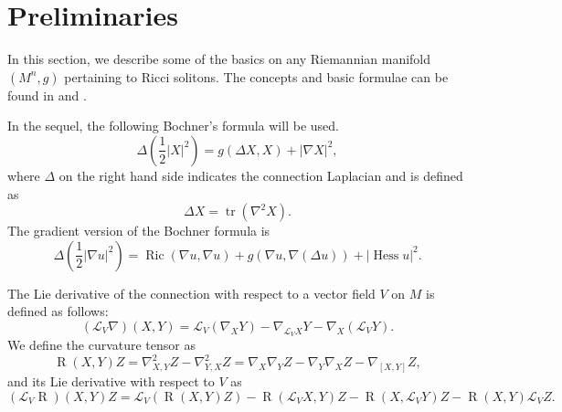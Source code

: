 \documentclass{amsart}
\newcommand{\abs}[1]{\left| #1 \right|}
\newcommand{\lie}[1]{\mathcal{L}_{#1}}
\newcommand{\brackets}[1]{\left( #1 \right)}
\DeclareMathOperator*{\ricci}{Ric}
\DeclareMathOperator*{\trace}{tr}
\DeclareMathOperator*{\curvature}{R}
\DeclareMathOperator*{\hessian}{Hess}
\theoremstyle{plain}
\theoremstyle{plain}
\theoremstyle{plain}
\theoremstyle{plain}
\theoremstyle{remark}
\begin{document}
\section{Preliminaries}\label{prelim}
In  this section,  we describe some of the basics  on any Riemannian manifold $(M^n,g)$  pertaining to Ricci solitons. The concepts and basic formulae  can be found  in \cite{MR3469435}  and  \cite{MR284950}.



In the sequel, the following Bochner's formula will be used. 
\begin{equation}\label{eqn: Bochner formula}
    \Delta\left( \frac{1}{2}\left| X \right|^2 \right) = g( \Delta X, X) + \left| \nabla X \right|^2 ,
\end{equation}
where $\Delta$ on the right hand side indicates the connection Laplacian and is defined as 
\begin{equation*}
    \Delta X =  \trace ( \nabla^2 X ). 
\end{equation*}
The gradient version of the Bochner formula is 
\begin{equation}\label{eqn: Bochner formula for gradient}
        \Delta \brackets{\frac{1}{2} \abs{\nabla u}^2} = \ricci \brackets{\nabla u, \nabla u} 
            + g \brackets{ \nabla u , \nabla \brackets{\Delta u} } + \abs{ \hessian u}^2. 
\end{equation}





The Lie derivative of the connection with respect to a vector field $V$  on $M$ is defined as follows:
\begin{equation*}
    (\lie{V}\nabla)(X,Y) = \lie{V}(\nabla_X Y) - \nabla_{\lie{V}X} Y - \nabla_X(\lie{V}Y) .
\end{equation*}
We define the curvature tensor as 
$$ \curvature (X,Y) Z = \nabla^2_{X,Y} Z - \nabla^2_{Y,X} Z 
	= \nabla_X \nabla_Y Z - \nabla_Y \nabla_X Z - \nabla_{[X,Y]} Z , $$
and its Lie derivative with respect to $V$ as
$$ (\lie{V} \curvature) (X,Y)Z = \lie{V} ( \curvature(X,Y)Z ) 
	- \curvature (\lie{V} X,Y)Z -\curvature (X, \lie{V}Y)Z - \curvature (X, Y) \lie{V}Z.  $$
\end{document}
